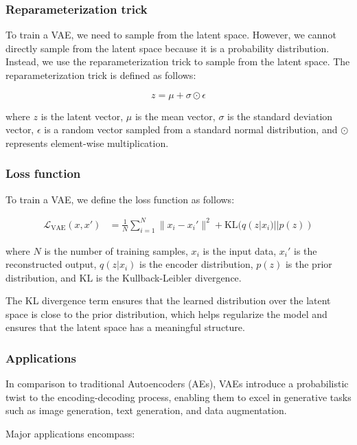 \documentclass{article}
\begin{document}
		\subsubsection{Reparameterization trick}

			To train a VAE, we need to sample from the latent space. However, we cannot directly sample from the latent space because it is a probability distribution. Instead, we use the reparameterization trick to sample from the latent space. The reparameterization trick is defined as follows:

			\[ z = \mu + \sigma \odot \epsilon \]

			where \(z\) is the latent vector, \(\mu\) is the mean vector, \(\sigma\) is the standard deviation vector, \(\epsilon\) is a random vector sampled from a standard normal distribution, and \(\odot\) represents element-wise multiplication.

		\subsubsection{Loss function}

			To train a VAE, we define the loss function as follows:

			\begin{align}
				\mathcal{L}_{\text{VAE}}(x, x') &= \frac{1}{N} \sum_{i=1}^{N} \|x_i - x_i'\|^2 + \text{KL}(q(z|x_i) || p(z))
			\end{align}

			where \(N\) is the number of training samples, \(x_i\) is the input data, \(x_i'\) is the reconstructed output, \(q(z|x_i)\) is the encoder distribution, \(p(z)\) is the prior distribution, and \(\text{KL}\) is the Kullback-Leibler divergence.

			The KL divergence term ensures that the learned distribution over the latent space is close to the prior distribution, which helps regularize the model and ensures that the latent space has a meaningful structure.


	\subsubsection{Applications}

			In comparison to traditional Autoencoders (AEs), VAEs introduce a probabilistic twist to the encoding-decoding process, enabling them to excel in generative tasks such as image generation, text generation, and data augmentation. 

			Major applications encompass:
\end{document}
